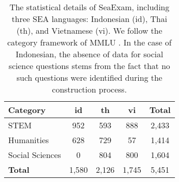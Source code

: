 \begin{table}[htb]
\centering
\small
\begin{tabular}{lcccc}
\toprule
\textbf{Category} & \textbf{id} & \textbf{th} & \textbf{vi} & \textbf{Total} \\
\midrule
STEM & 952 & 593 & 888 & 2,433 \\
Humanities & 628 & 729 & 57 & 1,414 \\
Social Sciences & 0 & 804 & 800 & 1,604 \\
\midrule
\textbf{Total} & 1,580 & 2,126 & 1,745 & 5,451 \\
\bottomrule
\end{tabular}
\caption{The statistical details of SeaExam, including three SEA languages: Indonesian (id), Thai (th), and Vietnamese (vi). We follow the category framework of MMLU \cite{hendrycks_measuring_2021}. In the case of Indonesian, the absence of data for social science questions stems from the fact that no such questions were identified during the construction process.}
\label{tab:stats_m3exam_mmlu_cates}
\end{table}
